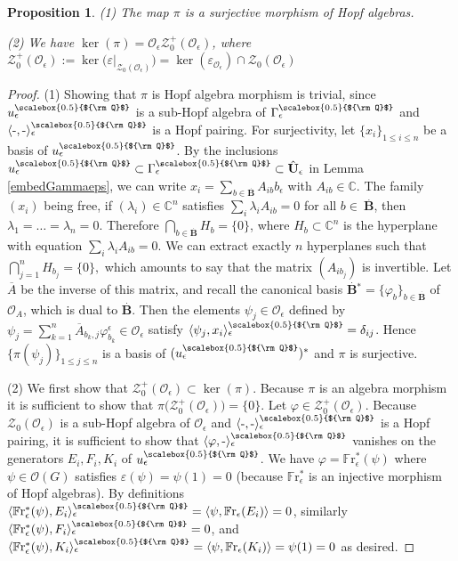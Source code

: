 \documentclass[11pt]{amsart}
\newtheorem{prop}[teo]{Proposition}
\newcommand{\e}{\epsilon}
\newcommand{\mc}{\mathbb{C}}
\newcommand{\Oo}{\mathcal{O}}
\newcommand{\Q}{{\scalebox{0.5}{${\rm Q}$}}}
\begin{document}
\begin{prop}\label{pipropO} (1) The map $\pi$ is a surjective morphism of Hopf algebras.

\noindent (2) We have $\ker(\pi)={\mathcal O}_\epsilon {\mathcal Z}_{0}^+(\Oo_\e)$, where $\mathcal{Z}_0^+(\Oo_\e) := \ker \bigl(\varepsilon\vert_{\mathcal{Z}_0(\Oo_\e)} \bigr) = \ker(\varepsilon_{\Oo_\e}) \cap {\mathcal Z}_0({\mathcal O}_\e)$
\end{prop}

\begin{proof}
(1) Showing that $\pi$ is Hopf algebra morphism is trivial, since $u_\epsilon^\Q$ is a sub-Hopf algebra of $\Gamma_\epsilon^\Q$ and $\langle \text{-}, \text{-} \rangle_{\e}^\Q$ is a Hopf pairing. For surjectivity, let $\{x_i\}_{1 \leq i \leq n}$ be a basis of $u_\epsilon^\Q$. By the inclusions $u_\epsilon^\Q \subset \Gamma_\epsilon^\Q \subset \hat{{\mathbf{U}}}_\e$ in Lemma \ref{embedGammaeps}, we can write
$\textstyle x_i=\sum_{b\in \stackrel{.}{\mathbf{B}}}A_{ib} b_\epsilon$ with $A_{ib}\in {\mathbb C}.$ The family $(x_i)$ being free, if $(\lambda_i)\in \mc^n$ satisfies $\textstyle \sum_{i}\lambda_i A_{ib}=0$ for all $b \in \:\stackrel{.}{\mathbf{B}}$, then $\lambda_1=\ldots=\lambda_n=0$. Therefore $\textstyle\bigcap_{b\in \stackrel{.}{\mathbf{B}}}H_b=\{0\}$, where $H_b \subset  {\mathbb C}^{n}$ is the hyperplane with equation $\textstyle \sum_{i}\lambda_i A_{ib}=0$. We can extract exactly $n$ hyperplanes such that $\textstyle \bigcap_{j=1}^nH_{b_j}=\{0\},$ which amounts to say that the matrix $(A_{ib_j})$  is invertible.
Let $\overline{A}$ be the inverse of this matrix, and recall the canonical basis $\stackrel{.}{\mathbf{B}}{\!\!^*} = \{\varphi_b \}_{b \in \stackrel{.}{\mathbf{B}}}$ of $\mathcal{O}_A$, which is dual to $\stackrel{.}{\mathbf{B}}$. Then the elements $\psi_j\in {\mathcal O}_\epsilon$ defined by $\textstyle \psi_j=\sum_{k=1}^n \overline{A}_{b_k,j} \varphi_{b_k}^{\epsilon} \in \mathcal{O}_{\epsilon}$ satisfy $\langle \psi_j, x_i\rangle_\epsilon^\Q =\delta_{ij}$. Hence $\bigl\{\pi(\psi_j) \bigr\}_{1 \leq j \leq n}$ is a basis of $(u_\epsilon^\Q)^*$ and $\pi$ is surjective.

(2) We first show that $\mathcal{Z}_0^+(\mathcal{O}_\e) \subset \ker(\pi)$. Because $\pi$ is an algebra morphism it is sufficient to show that $\pi\bigl( {\mathcal Z}_{0}^+(\Oo_\e) \bigr)=\{0\}$. Let $\varphi\in {\mathcal Z}_{0}^+(\Oo_\e)$. Because ${\mathcal Z}_0({\mathcal O}_\e)$ is a sub-Hopf algebra of ${\mathcal O}_\epsilon$ and $\langle \text{-},\text{-} \rangle_{\e}^\Q$ is a Hopf pairing, it is sufficient to show that $\langle \varphi ,\text{-} \rangle_{\e}^\Q$ vanishes on the generators $E_i,F_i,K_i$ of $u_\epsilon^\Q$. We have $\varphi=\mathbb{F}\mathrm{r}_\e^{*}(\psi)$ where $\psi \in {\mathcal  O}(G)$ satisfies $\varepsilon(\psi) = \psi(1)=0$ (because $\mathbb{F}\mathrm{r}_\e^{*}$ is an injective morphism of Hopf algebras). By definitions $\langle \mathbb{F}\mathrm{r}_\e^{*}(\psi), E_i\rangle_{\e}^\Q=\langle \psi , \mathbb{F}\mathrm{r}_\e(E_i)\rangle=0$, similarly $\langle \mathbb{F}\mathrm{r}_\e^{*}(\psi), F_i\rangle_{\e}^\Q=0$, and $\langle \mathbb{F}\mathrm{r}_\e^{*}(\psi), K_i\rangle_{\e}^\Q=\langle \psi , \mathbb{F}\mathrm{r}_\e(K_i)\rangle = \psi(1) =0$ as desired.


\end{proof}
\end{document}

